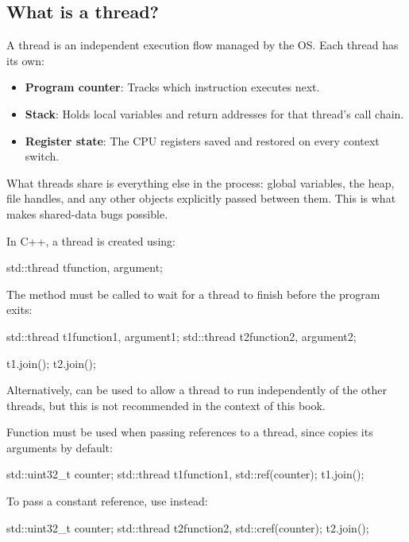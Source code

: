 \subsection{What is a thread?}
\label{c6:sec:thread}
A thread is an independent execution flow managed by the OS. Each thread has its own:
\begin{itemize}
  \item \textbf{Program counter}: Tracks which instruction executes next.
  \item \textbf{Stack}: Holds local variables and return addresses for that thread's call chain.
  \item \textbf{Register state}: The CPU registers saved and restored on every context switch.
\end{itemize}
What threads share is everything else in the process: global variables, the heap, file handles,
and any other objects explicitly passed between them. This is what makes shared-data bugs
possible.

In C++, a thread is created using:

\begin{cppcode}
std::thread t{function, argument};
\end{cppcode}

\note The  method must be called to wait for a thread to finish before the program
exits:

\begin{cppcode}
std::thread t1{function1, argument1};
std::thread t2{function2, argument2};

t1.join();
t2.join();
\end{cppcode}

\noindent Alternatively,  can be used to allow a thread to run independently of the
other threads, but this is not recommended in the context of this book.

\note Function  must be used when passing references to a thread, since
 copies its arguments by default:

\begin{cppcode}
std::uint32_t counter{};
std::thread t1{function1, std::ref(counter)};
t1.join();
\end{cppcode}

\noindent To pass a constant reference, use  instead:

\begin{cppcode}
std::uint32_t counter{};
std::thread t2{function2, std::cref(counter)};
t2.join();
\end{cppcode}

